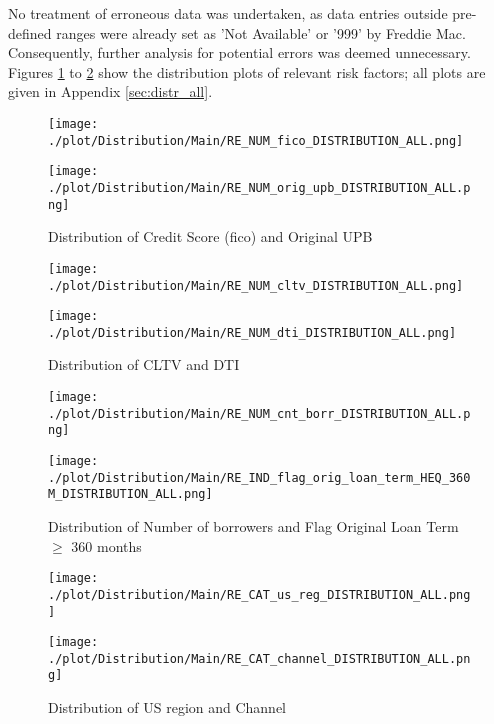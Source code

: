 No treatment of erroneous data was undertaken, as data entries outside pre-defined ranges were already set as 'Not Available' or '999' by Freddie Mac. Consequently, further analysis for potential errors was deemed unnecessary.
Figures \ref{fig:re_distr1} to \ref{fig:re_distr4} show the distribution plots of relevant risk factors; all plots are given in Appendix \ref{sec:distr_all}.

\begin{figure}[H]
\begin{minipage}{.5\textwidth}
	\centering
	\texttt{[image: ./plot/Distribution/Main/RE\_NUM\_fico\_DISTRIBUTION\_ALL.png]}
\end{minipage}%
\begin{minipage}{.5\textwidth}
	\centering
	\texttt{[image: ./plot/Distribution/Main/RE\_NUM\_orig\_upb\_DISTRIBUTION\_ALL.png]}
\end{minipage}
    \caption{Distribution of Credit Score (fico) and Original UPB}
    \label{fig:re_distr1}
\end{figure}
\begin{figure}[H]
\begin{minipage}{.5\textwidth}
	\centering
	\texttt{[image: ./plot/Distribution/Main/RE\_NUM\_cltv\_DISTRIBUTION\_ALL.png]}
\end{minipage}%
\begin{minipage}{.5\textwidth}
	\centering
	\texttt{[image: ./plot/Distribution/Main/RE\_NUM\_dti\_DISTRIBUTION\_ALL.png]}
\end{minipage}
    \caption{Distribution of CLTV and DTI}
\end{figure}
\begin{figure}[H]
\begin{minipage}{.5\textwidth}
	\centering
	\texttt{[image: ./plot/Distribution/Main/RE\_NUM\_cnt\_borr\_DISTRIBUTION\_ALL.png]}
\end{minipage}%
\begin{minipage}{.5\textwidth}
	\centering
	\texttt{[image: ./plot/Distribution/Main/RE\_IND\_flag\_orig\_loan\_term\_HEQ\_360M\_DISTRIBUTION\_ALL.png]}
\end{minipage}
    \caption{Distribution of Number of borrowers and Flag Original Loan Term $\geq$ 360 months}
\end{figure}
\begin{figure}[H]
\begin{minipage}{.5\textwidth}
	\centering
	\texttt{[image: ./plot/Distribution/Main/RE\_CAT\_us\_reg\_DISTRIBUTION\_ALL.png]}
\end{minipage}%
\begin{minipage}{.5\textwidth}
	\centering
	\texttt{[image: ./plot/Distribution/Main/RE\_CAT\_channel\_DISTRIBUTION\_ALL.png]}
\end{minipage}
    \caption{Distribution of US region and Channel}
    \label{fig:re_distr4}
\end{figure}

